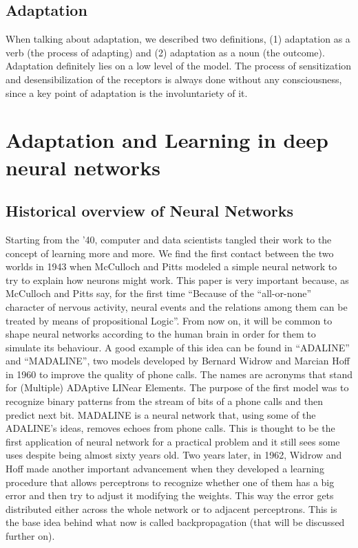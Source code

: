 \documentclass[conference]{IEEEtran}
\begin{document}
	\subsection{Adaptation}\label{Ad}
	When talking about adaptation, we described two definitions, (1) adaptation as a verb (the process of adapting) and (2) adaptation as a noun (the outcome). Adaptation definitely lies on a low level of the model. The process of sensitization and desensibilization of the receptors is always done without any consciousness, since a key point of adaptation is the involuntariety of it.


\section{Adaptation and Learning in deep neural networks}

	\subsection{Historical overview of Neural Networks}\label{HONN}
	Starting from the '40, computer and data scientists tangled their work to the concept of learning more and more.
	We find the first contact between the two worlds in 1943 when McCulloch and Pitts modeled a simple neural network to try to explain how neurons might work. \cite{f1}
	This paper is very important because, as McCulloch and Pitts say, for the first time ``Because of the ``all-or-none'' character of nervous activity, neural events and the relations among them can be treated by means of propositional Logic''. From now on, it will be common to shape neural networks according to the human brain in order for them to simulate its behaviour.
	A good example of this idea can be found in ``ADALINE'' and ``MADALINE'', two models developed by Bernard Widrow and Marcian Hoff in 1960 to improve the quality of phone calls. The names are acronyms that stand for (Multiple) ADAptive LINear Elements. The purpose of the first model was to recognize binary patterns from the stream of bits of a phone calls and then predict next bit. MADALINE is a neural network that, using some of the ADALINE's ideas, removes echoes from phone calls. This is thought to be the first application of neural network for a practical problem and it still sees some uses despite being almost sixty years old. \cite{f2}
	Two years later, in 1962, Widrow and Hoff made another important advancement when they developed a learning procedure that allows perceptrons to recognize whether one of them has a big error and then try to adjust it modifying the weights. This way the error gets distributed either across the whole network or to adjacent perceptrons. \cite{f3} This is the base idea behind what now is called backpropagation (that will be discussed further on).
\end{document}
